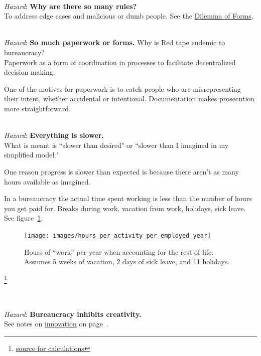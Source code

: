 \ \\
\textit{Hazard}: \textbf{Why are there so many rules?}\\
To address edge cases and malicious or dumb people. See the \hyperref[table:dilemma-subject-forms]{Dilemma of Forms}.

\ \\
\textit{Hazard}: \textbf{So much paperwork or forms.}
Why is Red tape endemic to bureaucracy?\\
Paperwork as a form of coordination in processes to facilitate decentralized decision making. 

One of the motives for paperwork is to catch people who are misrepresenting their intent, whether accidental or intentional. Documentation makes prosecution more straightforward.

\ \\
\textit{Hazard}: \textbf{Everything is slower.}\\
What is meant is ``slower than desired" or ``slower than I imagined in my simplified model."

One reason progress is slower than expected is because there aren't as many hours available as imagined.



In a bureaucracy the actual time spent working is less than the number of hours you get paid for. Breaks during work, vacation from work, holidays, sick leave. See figure~\ref{fig:hours_per_year}.


\begin{figure}[H]
    \centering
    \texttt{[image: images/hours\_per\_activity\_per\_employed\_year]}
    \caption{Hours of ``work'' per year when accounting for the rest of life. Assumes 5 weeks of vacation, 2 days of sick leave, and 11 holidays.}
    \label{fig:hours_per_year}
\end{figure}


\footnote{\href{https://docs.google.com/spreadsheets/d/1ZaOZZXWkEzX4fFltUdlR4A6ENrAXnkzTW4YrjA4tDO8/edit?usp=sharing}{source for calculations}}

\ \\
\begin{samepage}
\textit{Hazard}: \textbf{Bureaucracy inhibits creativity.}\\
See 
notes on \hyperref[sec:innovation]{innovation} on page~\pageref{sec:innovation}.
\end{samepage}

